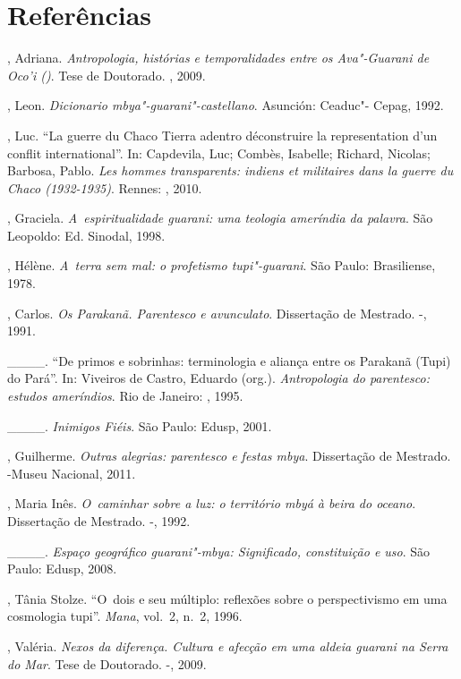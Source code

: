 \section{Referências}

\begin{Parskip}
, Adriana. \emph{Antropologia, histórias e
temporalidades entre os Ava"-Guarani de Oco’i ()}. Tese de Doutorado.
, 2009.

, Leon. \emph{Dicionario mbya"-guarani"-castellano}. Asunción: Ceaduc"-
Cepag, 1992.

, Luc. ``La guerre du Chaco Tierra adentro déconstruire la
representation d’un conflit international''. In: Capdevila, Luc;
Combès, Isabelle; Richard, Nicolas; Barbosa, Pablo. \emph{Les
hommes transparents: indiens et militaires dans la guerre du Chaco
(1932-1935)}. Rennes: , 2010.

, Graciela. \emph{A~espiritualidade guarani: uma teologia ameríndia
da palavra}. São Leopoldo: Ed. Sinodal, 1998.

, Hélène. \emph{A~terra sem mal: o profetismo tupi"-guarani}. São Paulo:
Brasiliense, 1978.

, Carlos. \emph{Os Parakanã. Parentesco e avunculato}. Dissertação de
Mestrado. -, 1991.

\_\_\_\_. ``De primos e sobrinhas: terminologia e aliança entre os Parakanã
(Tupi) do Pará''. In: Viveiros de Castro, Eduardo (org.). \emph{Antropologia do
parentesco: estudos ameríndios}. Rio de Janeiro: , 1995.

\_\_\_\_. \emph{Inimigos Fiéis}. São Paulo: Edusp, 2001.

, Guilherme. \emph{Outras alegrias: parentesco e festas mbya}.
 Dissertação de Mestrado. -Museu Nacional, 2011.

, Maria Inês. \emph{O~caminhar sobre a luz: o território mbyá à beira
do oceano}. Dissertação de Mestrado. -, 1992.

\_\_\_\_. \emph{Espaço geográfico guarani"-mbya: Significado,
constituição e uso}. São Paulo: Edusp, 2008.

, Tânia Stolze. ``O~dois e seu múltiplo: reflexões sobre o
perspectivismo em uma cosmologia tupi''. \emph{Mana}, vol.~2, n.~2, 1996.

, Valéria. \emph{Nexos da diferença. Cultura e afecção em uma aldeia
guarani na Serra do Mar}. Tese de Doutorado. -, 2009.


\end{Parskip}
